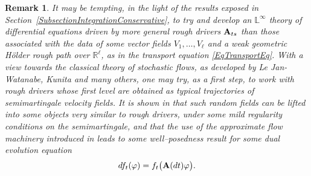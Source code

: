 \documentclass[11pt,a4paper]{amsart}
\newcommand{\RR}{\mathbb{R}}  \newcommand{\CC}{\mathbb{C}}  \newcommand{\LL}{\mathbb{L}}  \newcommand{\WW}{\mathbb{W}}
\newtheorem{rem}[thm]{{\sc Remark}}
\numberwithin{equation}{section} %
\begin{document}
\begin{rem}
It may be tempting, in the light of the results exposed in Section~\ref{SubsectionIntegrationConservative}, to try and develop an $\LL^\infty$ theory of differential equations driven by more general rough drivers ${\bf A}_{ts}$ than those associated with the data of some vector fields $V_1,\dots, V_\ell$ and a weak geometric H\"older rough path over $\RR^\ell$, as in the transport equation \eqref{EqTransportEq}. With a view towards the classical theory of stochastic flows, as developed by Le Jan-Watanabe, Kunita and many others, one may try, as a first step, to work with rough drivers whose first level are obtained as typical trajectories of semimartingale velocity fields. It is shown in \cite{BailleulRiedel} that such random fields can be lifted into some objects very similar to rough drivers, under some mild regularity conditions on the semimartingale, and that the use of the approximate flow machinery introduced in \cite{BailleulRMI} leads to some well--posedness result for some dual evolution equation 
$$
df_t(\varphi) = f_t\big({\bf A}(dt)\varphi\big) .   
$$ 
\end{rem}



\bigskip
\end{document}
